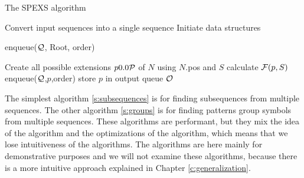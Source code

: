 \begin{algorithm}
	\caption{The SPEXS algorithm}
	\label{s:general}
\begin{algorithmic}[1]

	\State Convert input sequences into a single sequence
	\State Initiate data structures

	\State enqueue($\mathcal{Q}$, Root, order)

		\State Create all possible extensions $p \in \sym{P}$ of $N$ using $N$.pos and $S$
				\State calculate $\mathcal{F}(p,S)$
				\State enqueue($\mathcal{Q}$,$p$,order)
					\State store $p$ in output queue $\mathcal{O}$
				\EndIf
			\EndIf
		\EndFor
	\EndWhile
\end{algorithmic}
\end{algorithm}

The simplest algorithm \ref{s:subsequences} is for finding subsequences from multiple sequences. The other algorithm \ref{s:groups} is for finding patterns group symbols from multiple sequences. These algorithms are performant, but they mix the idea of the algorithm and the optimizations of the algorithm, which means that we lose intuitiveness of the algorithms. The algorithms are here mainly for demonstrative purposes and we will not examine these algorithms, because there is a more intuitive approach explained in Chapter \ref{c:generalization}. 


